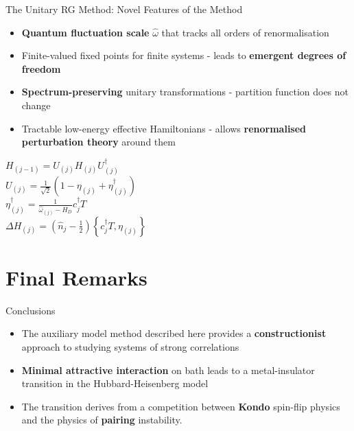 \documentclass[10pt,aspectratio=169]{beamer}
\newcommand{\focus}[1]{\textcolor{lblue}{\textbf{#1}}}
\begin{document}
\begin{frame}[noframenumbering]{The Unitary RG Method: Novel Features of the Method}

\begin{minipage}{0.65\textwidth}
\begin{itemize}[<+->]
	\item \focus{Quantum fluctuation scale} \(\hat \omega\)	that tracks all orders of renormalisation\\[10pt]
	\item Finite-valued fixed points for finite systems - leads to \focus{emergent degrees of freedom}\\[10pt]
	\item \focus{Spectrum-preserving} unitary transformations - partition function does not change\\[10pt]
	\item Tractable low-energy effective Hamiltonians - allows \focus{renormalised perturbation theory} around them 
\end{itemize}
\end{minipage}
\hspace*{\fill}
\begin{minipage}{0.3\textwidth}
\centering
\(H_{(j-1)} = U_{(j)} H_{(j)} U_{(j)}^\dagger\)\\[15pt]
\(U_{(j)} = \frac{1}{\sqrt 2}\left(1 - \eta_{(j)} + \eta_{(j)}^\dagger\right) \)\\[15pt]
\( \eta^\dagger_{(j)} = \frac{1}{\hat \omega_{(j)} - H_D}c^\dagger_j T\)\\[15pt]
\( \Delta H_{(j)} = \left(\hat n_j - \frac{1}{2}\right) \left\{c^\dagger_j T, \eta_{(j)}\right\} \)
\end{minipage}
\end{frame}

\section{Final Remarks}
\label{concl}

\begin{frame}[noframenumbering]{Conclusions}
	\begin{itemize}[<+->]
		\item The auxiliary model method described here provides a \focus{constructionist} approach to studying systems of strong correlations
		\item \focus{Minimal attractive interaction} on bath leads to a metal-insulator transition in the Hubbard-Heisenberg model
		\item The transition derives from a competition between \focus{Kondo} spin-flip physics and the physics of \focus{pairing} instability.
\end{itemize}
\end{frame}
\end{document}
